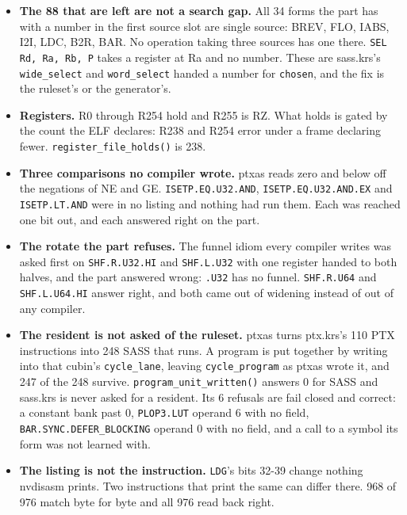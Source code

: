 \begin{enumerate}
\begin{itemize}
\item \textbf{The 88 that are left are not a search gap.} All 34 forms the part has with a number in the first source slot are single source: BREV, FLO, IABS, I2I, LDC, B2R, BAR. No operation taking three sources has one there. \texttt{SEL Rd, Ra, Rb, P} takes a register at Ra and no number. These are sass.krs's \texttt{wide\_\allowbreak{}select} and \texttt{word\_\allowbreak{}select} handed a number for \texttt{chosen}, and the fix is the ruleset's or the generator's.
\item \textbf{Registers.} R0 through R254 hold and R255 is RZ. What holds is gated by the count the ELF declares: R238 and R254 error under a frame declaring fewer. \texttt{register\_\allowbreak{}file\_\allowbreak{}holds()} is 238.
\item \textbf{Three comparisons no compiler wrote.} ptxas reads zero and below off the negations of NE and GE. \texttt{ISETP.\allowbreak{}EQ.\allowbreak{}U32.\allowbreak{}AND}, \texttt{ISETP.\allowbreak{}EQ.\allowbreak{}U32.\allowbreak{}AND.\allowbreak{}EX} and \texttt{ISETP.\allowbreak{}LT.\allowbreak{}AND} were in no listing and nothing had run them. Each was reached one bit out, and each answered right on the part.
\item \textbf{The rotate the part refuses.} The funnel idiom every compiler writes was asked first on \texttt{SHF.\allowbreak{}R.\allowbreak{}U32.\allowbreak{}HI} and \texttt{SHF.\allowbreak{}L.\allowbreak{}U32} with one register handed to both halves, and the part answered wrong: \texttt{.\allowbreak{}U32} has no funnel. \texttt{SHF.\allowbreak{}R.\allowbreak{}U64} and \texttt{SHF.\allowbreak{}L.\allowbreak{}U64.\allowbreak{}HI} answer right, and both came out of widening instead of out of any compiler.
\item \textbf{The resident is not asked of the ruleset.} ptxas turns ptx.krs's 110 PTX instructions into 248 SASS that runs. A program is put together by writing into that cubin's \texttt{cycle\_\allowbreak{}lane}, leaving \texttt{cycle\_\allowbreak{}program} as ptxas wrote it, and 247 of the 248 survive. \texttt{program\_\allowbreak{}unit\_\allowbreak{}written()} answers 0 for SASS and sass.krs is never asked for a resident. Its 6 refusals are fail closed and correct: a constant bank past 0, \texttt{PLOP3.\allowbreak{}LUT} operand 6 with no field, \texttt{BAR.\allowbreak{}SYNC.\allowbreak{}DEFER\_\allowbreak{}BLOCKING} operand 0 with no field, and a call to a symbol its form was not learned with.
\item \textbf{The listing is not the instruction.} \texttt{LDG}'s bits 32-39 change nothing nvdisasm prints. Two instructions that print the same can differ there. 968 of 976 match byte for byte and all 976 read back right.

\end{itemize}
\end{enumerate}
